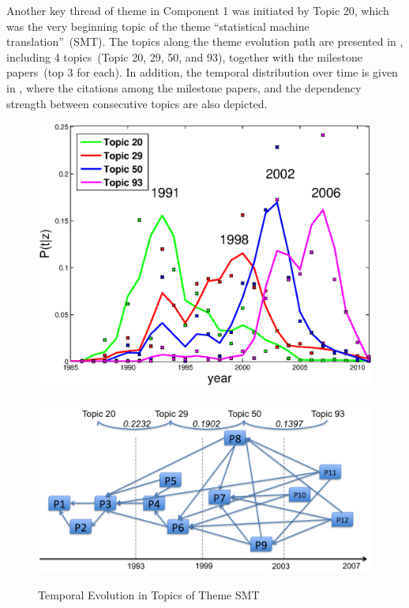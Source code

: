Another key thread of theme in Component 1 was initiated by Topic 20, which was
the very beginning topic of the theme ``statistical machine translation''~(SMT).
The topics along the theme evolution path are presented in ,
including 4 topics~(Topic 20, 29, 50, and 93), together with the milestone
papers~(top 3 for each). In addition, the temporal distribution over time is
given in , where the citations among the milestone
papers, and the dependency strength between consecutive topics are also
depicted.


\begin{figure}[h!]
  \begin{center}
    \includegraphics[scale= .6]{citation-lda/plot/smt_4topic_temporal}
    ~
    \includegraphics[scale= .45]{citation-lda/plot/smt_milestone_link}
  \end{center}
  \caption{Temporal Evolution in Topics of Theme SMT}\label{fig:smt_temporal}
\end{figure}

